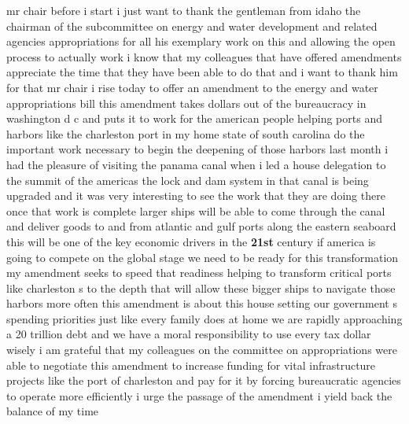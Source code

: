 \documentclass{article}
\begin{document}
mr chair before i start i just want to thank the gentleman from idaho the chairman of the subcommittee on energy and water development and related agencies appropriations for all his exemplary work on this and allowing the open process to actually work i know that my colleagues that have offered amendments appreciate the time that they have been able to do that and i want to thank him for that mr chair i rise today to offer an amendment to the energy and water appropriations bill this amendment takes dollars out of the bureaucracy in washington d c and puts it to work for the american people helping ports and harbors like the charleston port in my home state of south carolina do the important work necessary to begin the deepening of those harbors last month i had the pleasure of visiting the panama canal when i led a house delegation to the summit of the americas the lock and dam system in that canal is being upgraded and it was very interesting to see the work that they are doing there once that work is complete larger ships will be able to come through the canal and deliver goods to and from atlantic and gulf ports along the eastern seaboard this will be one of the key economic drivers in the {\bf \color{red} 21st} century if america is going to compete on the global stage we need to be ready for this transformation my amendment seeks to speed that readiness helping to transform critical ports like charleston s to the depth that will allow these bigger ships to navigate those harbors more often this amendment is about this house setting our government s spending priorities just like every family does at home we are rapidly approaching a 20 trillion debt and we have a moral responsibility to use every tax dollar wisely i am grateful that my colleagues on the committee on appropriations were able to negotiate this amendment to increase funding for vital infrastructure projects like the port of charleston and pay for it by forcing bureaucratic agencies to operate more efficiently i urge the passage of the amendment i yield back the balance of my time
\vspace{8mm}
\end{document}
